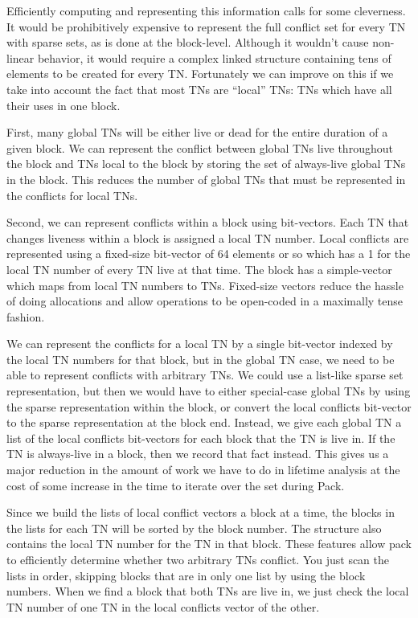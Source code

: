 Efficiently computing and representing this information calls for some
cleverness.  It would be prohibitively expensive to represent the full conflict
set for every TN with sparse sets, as is done at the block-level.  Although it
wouldn't cause non-linear behavior, it would require a complex linked structure
containing tens of elements to be created for every TN.  Fortunately we can
improve on this if we take into account the fact that most TNs are ``local'' TNs:
TNs which have all their uses in one block.

First, many global TNs will be either live or dead for the entire duration of a
given block.  We can represent the conflict between global TNs live throughout
the block and TNs local to the block by storing the set of always-live global
TNs in the block.  This reduces the number of global TNs that must be
represented in the conflicts for local TNs.

Second, we can represent conflicts within a block using bit-vectors.  Each TN
that changes liveness within a block is assigned a local TN number.  Local
conflicts are represented using a fixed-size bit-vector of 64 elements or so
which has a 1 for the local TN number of every TN live at that time.  The block
has a simple-vector which maps from local TN numbers to TNs.  Fixed-size
vectors reduce the hassle of doing allocations and allow operations to be
open-coded in a maximally tense fashion.

We can represent the conflicts for a local TN by a single bit-vector indexed by
the local TN numbers for that block, but in the global TN case, we need to be
able to represent conflicts with arbitrary TNs.  We could use a list-like
sparse set representation, but then we would have to either special-case global
TNs by using the sparse representation within the block, or convert the local
conflicts bit-vector to the sparse representation at the block end.  Instead,
we give each global TN a list of the local conflicts bit-vectors for each block
that the TN is live in.  If the TN is always-live in a block, then we record
that fact instead.  This gives us a major reduction in the amount of work we
have to do in lifetime analysis at the cost of some increase in the time to
iterate over the set during Pack.

Since we build the lists of local conflict vectors a block at a time, the
blocks in the lists for each TN will be sorted by the block number.  The
structure also contains the local TN number for the TN in that block.  These
features allow pack to efficiently determine whether two arbitrary TNs
conflict.  You just scan the lists in order, skipping blocks that are in only
one list by using the block numbers.  When we find a block that both TNs are
live in, we just check the local TN number of one TN in the local conflicts
vector of the other.

